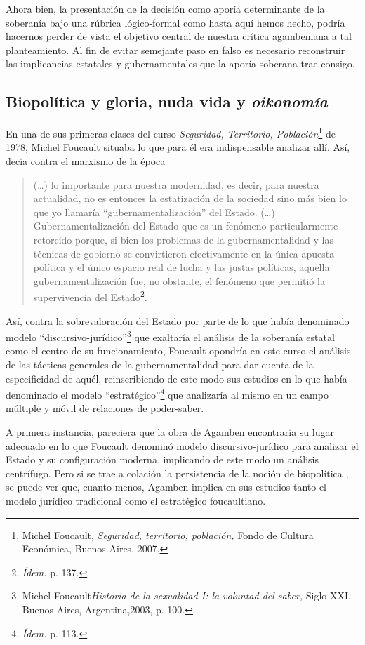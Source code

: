 Ahora bien, la presentación de la decisión como aporía determinante de la soberanía bajo una rúbrica lógico-formal como hasta aquí hemos hecho, podría hacernos perder de vista el objetivo central de nuestra crítica agambeniana a tal planteamiento. Al fin de evitar semejante paso en falso es necesario reconstruir las implicancias estatales y gubernamentales que la aporía soberana trae consigo.

\subsection{Biopolítica y gloria, nuda vida y \emph{oikonomía}}

En una de sus primeras clases del curso \emph{Seguridad, Territorio, Población}\footnote{Michel Foucault, \emph{Seguridad, territorio, población,} Fondo de Cultura Económica, Buenos Aires, 2007.} de 1978, Michel Foucault situaba lo que para él era indispensable analizar allí. Así, decía contra el marxismo de la época 

\begin{quote}
(\dots) lo importante para nuestra modernidad, es decir, para nuestra actualidad, no es entonces la estatización de la sociedad sino más bien lo que yo llamaría \enquote{gubernamentalización} del Estado. (\dots) Gubernamentalización del Estado que es un fenómeno particularmente retorcido porque, si bien los problemas de la gubernamentalidad y las técnicas de gobierno se convirtieron efectivamente en la única apuesta política y el único espacio real de lucha y las justas políticas, aquella gubernamentalización fue, no obstante, el fenómeno que permitió la supervivencia del Estado\footnote{\emph{Ídem.} p. 137.}.
\end{quote}

Así, contra la sobrevaloración del Estado por parte de lo que había denominado modelo \enquote{discursivo-jurídico}\footnote{Michel Foucault\emph{Historia de la sexualidad I: la voluntad del saber,} Siglo XXI, Buenos Aires, Argentina,2003, p. 100.} que exaltaría el análisis de la soberanía estatal como el centro de su funcionamiento, Foucault opondría en este curso el análisis de las tácticas generales de la gubernamentalidad para dar cuenta de la especificidad de aquél, reinscribiendo de este modo sus estudios en lo que había denominado el modelo \enquote{estratégico}\footnote{\emph{Ídem.} p. 113.} que analizaría al mismo en un campo múltiple y móvil de relaciones de poder-saber.

A primera instancia, pareciera que la obra de Agamben encontraría su lugar adecuado en lo que Foucault denominó modelo discursivo-jurídico para analizar el Estado y su configuración moderna, implicando de este modo un análisis centrífugo. Pero si se trae a colación la persistencia de la noción de biopolítica , se puede ver que, cuanto menos, Agamben implica en sus estudios tanto el modelo jurídico tradicional como el estratégico foucaultiano.

